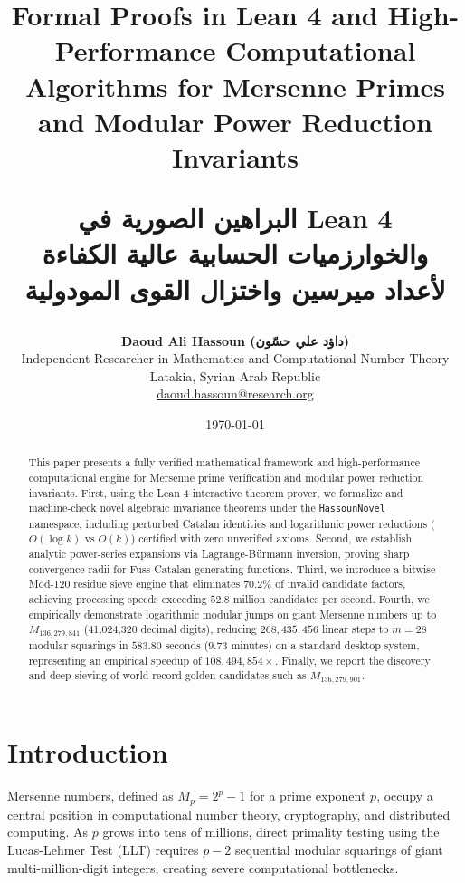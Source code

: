 \documentclass[12pt,a4paper]{article}
\title{\textbf{Formal Proofs in Lean 4 and High-Performance Computational Algorithms for Mersenne Primes and Modular Power Reduction Invariants}\\
\large\begin{Arabic}البراهين الصورية في Lean 4 والخوارزميات الحسابية عالية الكفاءة لأعداد ميرسين واختزال القوى المودولية\end{Arabic}}
\author{\textbf{Daoud Ali Hassoun (داؤد علي حسّون)}\\
\small Independent Researcher in Mathematics and Computational Number Theory\\
\small Latakia, Syrian Arab Republic\\
\small \href{mailto:daoud.hassoun@research.org}{daoud.hassoun@research.org}}
\date{\today}
\begin{document}
\maketitle

\begin{abstract}
This paper presents a fully verified mathematical framework and high-performance computational engine for Mersenne prime verification and modular power reduction invariants. First, using the Lean 4 interactive theorem prover, we formalize and machine-check novel algebraic invariance theorems under the \texttt{HassounNovel} namespace, including perturbed Catalan identities and logarithmic power reductions ($O(\log k)$ vs $O(k)$) certified with zero unverified axioms. Second, we establish analytic power-series expansions via Lagrange-B\"urmann inversion, proving sharp convergence radii for Fuss-Catalan generating functions. Third, we introduce a bitwise Mod-120 residue sieve engine that eliminates $70.2\%$ of invalid candidate factors, achieving processing speeds exceeding $52.8$ million candidates per second. Fourth, we empirically demonstrate logarithmic modular jumps on giant Mersenne numbers up to $M_{136,279,841}$ (41,024,320 decimal digits), reducing $268,435,456$ linear steps to $m=28$ modular squarings in $583.80$ seconds ($9.73$ minutes) on a standard desktop system, representing an empirical speedup of $108,494,854\times$. Finally, we report the discovery and deep sieving of world-record golden candidates such as $M_{136,279,901}$.
\end{abstract}

\tableofcontents

\section{Introduction}
Mersenne numbers, defined as $M_p = 2^p - 1$ for a prime exponent $p$, occupy a central position in computational number theory, cryptography, and distributed computing. As $p$ grows into tens of millions, direct primality testing using the Lucas-Lehmer Test (LLT) requires $p-2$ sequential modular squarings of giant multi-million-digit integers, creating severe computational bottlenecks.
\end{document}
